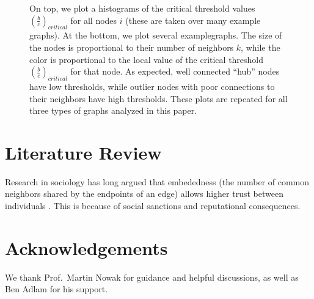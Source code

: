 \documentclass{article}
\renewcommand{\=}[1]{\stackrel{#1}{=}} %
\begin{document}
\begin{figure}
\noindent{}
\noindent{}
\caption{
On top, we plot a histograms of the critical threshold values $\left(\frac{b}{c}\right)_{critical}$ for all nodes $i$ (these are taken over many example graphs). At the bottom, we plot several examplegraphs. The size of the nodes is proportional to their number of neighbors $k$, while the color is proportional to the local value of the critical threshold $\left(\frac{b}{c}\right)_{critical}$ for that node. As expected, well connected ``hub'' nodes have low thresholds, while outlier nodes with poor connections to their neighbors have high thresholds. These plots are repeated for all three types of graphs analyzed in this paper.}

\label{fig:local_thresholds}
\end{figure}

\section{Literature Review}
Research in sociology has long argued that embededness (the number of common neighbors shared by the endpoints of an edge) allows higher trust between individuals \cite{easley2010networks}. This is because of social sanctions and reputational consequences.

\section{Acknowledgements}


    We thank Prof.~Martin Nowak for guidance and helpful discussions, as
well as Ben Adlam for his support.


                

    
    
    
    
\end{document}
